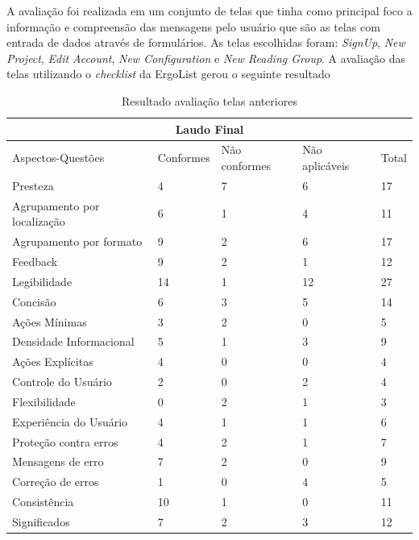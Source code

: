 A avaliação foi realizada em um conjunto de telas que tinha como principal foco a informação e compreensão das mensagens pelo usuário que são as telas com entrada de dados através de formulários. As telas escolhidas foram: \textit{SignUp}, \textit{New Project}, \textit{Edit Account}, \textit{New Configuration} e \textit{New Reading Group}. A avaliação das telas utilizando o \textit{checklist} da ErgoList gerou o seguinte resultado

\begin{table}[H]
\begin{tabular}{|l|l|l|l|l|}
\hline
\multicolumn{5}{c}{\textbf{Laudo Final}}                                         \\ \hline
Aspectos-Questões           & Conformes & Não conformes & Não aplicáveis & Total \\ \hline
Presteza                    & 4         & 7             & 6              & 17    \\ \hline
Agrupamento por localização & 6         & 1             & 4              & 11    \\ \hline
Agrupamento por formato     & 9         & 2             & 6              & 17    \\ \hline
Feedback                    & 9         & 2             & 1              & 12    \\ \hline
Legibilidade                & 14        & 1             & 12             & 27    \\ \hline
Concisão                    & 6         & 3             & 5              & 14    \\ \hline
Ações Mínimas               & 3         & 2             & 0              & 5     \\ \hline
Densidade Informacional     & 5         & 1             & 3              & 9     \\ \hline
Ações Explícitas            & 4         & 0             & 0              & 4     \\ \hline
Controle do Usuário         & 2         & 0             & 2              & 4     \\ \hline
Flexibilidade               & 0         & 2             & 1              & 3     \\ \hline
Experiência do Usuário      & 4         & 1             & 1              & 6     \\ \hline
Proteção contra erros       & 4         & 2             & 1              & 7     \\ \hline
Mensagens de erro           & 7         & 2             & 0              & 9     \\ \hline
Correção de erros           & 1         & 0             & 4              & 5     \\ \hline
Consistência                & 10        & 1             & 0              & 11    \\ \hline
Significados                & 7         & 2             & 3              & 12    \\ \hline
\end{tabular}
\caption{Resultado avaliação telas anteriores}
\end{table}


